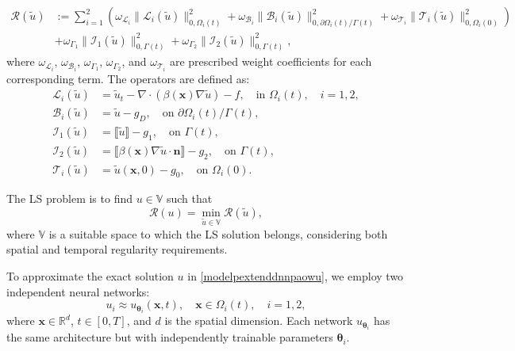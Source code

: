 \documentclass{article}
\begin{document}
\begin{equation}
\begin{aligned}
    \mathcal{R}(\tilde{u}) &:= \sum_{i=1}^{2} \left(\omega_{\mathcal{L}_i} \|\mathcal{L}_i(\tilde{u})\|_{0,\Omega_i(t)}^2 + \omega_{\mathcal{B}_i} \|\mathcal{B}_i(\tilde{u})\|_{0,\partial\Omega_i(t) / \Gamma(t)}^2 + \omega_{\mathcal{T}_i} \|\mathcal{T}_i(\tilde{u})\|_{0,\Omega_i(0) }^2\right)  \\
    & + \omega_{\Gamma_1} \|\mathcal{I}_1(\tilde{u})\|_{0,\Gamma(t)}^2+ \omega_{\Gamma_2} \|\mathcal{I}_2(\tilde{u})\|_{0,\Gamma(t)}^2 ,
\end{aligned}
\end{equation}
where $\omega_{\mathcal{L}_i}$, $\omega_{\mathcal{B}_i}$, $\omega_{\Gamma_1}$, $\omega_{\Gamma_2}$, and $\omega_{\mathcal{T}_i}$ are prescribed weight coefficients for each corresponding term. The operators are defined as:
\begin{equation}
    \begin{aligned}
\mathcal{L}_i(\tilde{u}) &= \tilde{u}_t - \nabla \cdot (\beta(\boldsymbol{x}) \nabla \tilde{u}) - f, \quad \text{in } \Omega_i(t), \quad i=1,2, \\
\mathcal{B}_i(\tilde{u}) &= \tilde{u} - g_D, \quad \text{on } \partial\Omega_i(t) / \Gamma(t), \\
\mathcal{I}_1(\tilde{u}) &= \llbracket \tilde{u} \rrbracket - g_1, \quad \text{on } \Gamma(t), \\
\mathcal{I}_2(\tilde{u}) &= \llbracket \beta(\boldsymbol{x}) \nabla \tilde{u} \cdot \boldsymbol{n} \rrbracket - g_2, \quad \text{on } \Gamma(t), \\
\mathcal{T}_i(\tilde{u}) &= \tilde{u}(\boldsymbol{x},0) - g_0, \quad \text{on } \Omega_i(0).
\end{aligned}
\end{equation}

The LS problem is to find $u \in \mathbb{V}$ such that
\begin{equation}
    \mathcal{R}(u) = \min_{\tilde{u} \in \mathbb{V}} \mathcal{R}(\tilde{u}),
\end{equation}
where $\mathbb{V}$ is a suitable space to which the LS solution belongs, considering both spatial and temporal regularity requirements.

To approximate the exact solution $u$ in \eqref{modelpextenddnnpaowu}, we employ two independent neural networks:
$$
u_i \approx u_{\boldsymbol{\theta}_i}(\boldsymbol{x},t), \quad \boldsymbol{x} \in \Omega_i(t), \quad i = 1, 2,
$$
where $\boldsymbol{x} \in \mathbb{R}^d$, $t \in [0,T]$, and $d$ is the spatial dimension. Each network $u_{\boldsymbol{\theta}_i}$ has the same architecture but with independently trainable parameters $\boldsymbol{\theta}_i$.
\end{document}
